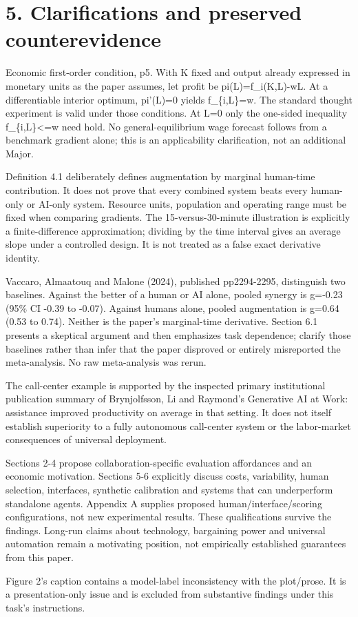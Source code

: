 \documentclass[10pt]{article}
\begin{document}
\section*{5. Clarifications and preserved counterevidence}
Economic first-order condition, p5. With K fixed and output already expressed in monetary units as the paper assumes, let profit be pi(L)=f\_i(K,L)-wL. At a differentiable interior optimum, pi’(L)=0 yields f\_\{i,L\}=w. The standard thought experiment is valid under those conditions. At L=0 only the one-sided inequality f\_\{i,L\}<=w need hold. No general-equilibrium wage forecast follows from a benchmark gradient alone; this is an applicability clarification, not an additional Major.\par
Definition 4.1 deliberately defines augmentation by marginal human-time contribution. It does not prove that every combined system beats every human-only or AI-only system. Resource units, population and operating range must be fixed when comparing gradients. The 15-versus-30-minute illustration is explicitly a finite-difference approximation; dividing by the time interval gives an average slope under a controlled design. It is not treated as a false exact derivative identity.\par
Vaccaro, Almaatouq and Malone (2024), published pp2294-2295, distinguish two baselines. Against the better of a human or AI alone, pooled synergy is g=-0.23 (95\% CI -0.39 to -0.07). Against humans alone, pooled augmentation is g=0.64 (0.53 to 0.74). Neither is the paper’s marginal-time derivative. Section 6.1 presents a skeptical argument and then emphasizes task dependence; clarify those baselines rather than infer that the paper disproved or entirely misreported the meta-analysis. No raw meta-analysis was rerun.\par
The call-center example is supported by the inspected primary institutional publication summary of Brynjolfsson, Li and Raymond’s Generative AI at Work: assistance improved productivity on average in that setting. It does not itself establish superiority to a fully autonomous call-center system or the labor-market consequences of universal deployment.\par
Sections 2-4 propose collaboration-specific evaluation affordances and an economic motivation. Sections 5-6 explicitly discuss costs, variability, human selection, interfaces, synthetic calibration and systems that can underperform standalone agents. Appendix A supplies proposed human/interface/scoring configurations, not new experimental results. These qualifications survive the findings. Long-run claims about technology, bargaining power and universal automation remain a motivating position, not empirically established guarantees from this paper.\par
Figure 2’s caption contains a model-label inconsistency with the plot/prose. It is a presentation-only issue and is excluded from substantive findings under this task’s instructions.\par
\end{document}
